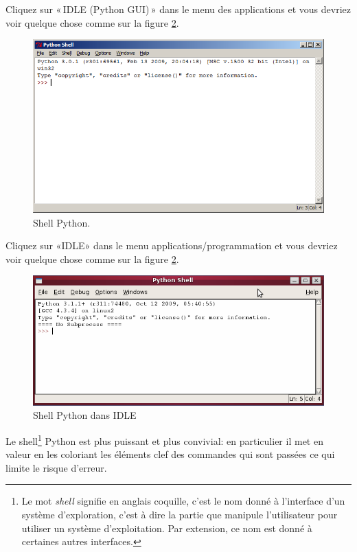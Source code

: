 \begin{WINDOWS}
Cliquez sur « IDLE (Python GUI) » dans le menu des applications et vous devriez voir quelque chose comme sur la figure \ref{fig:shell}.

\begin{figure}[!ht]
\centering
\includegraphics[scale=0.6]{images/shell}
\caption{Shell Python.}\label{fig:shell}
\end{figure}
\end{WINDOWS}

\begin{LINUX}
Cliquez sur «IDLE» dans le menu applications/programmation et vous devriez 
voir quelque chose comme sur la figure \ref{fig:shell}.

\begin{figure}[!ht]
\centering
\includegraphics[scale=0.6]{images/linux-idle-shell}
\caption{Shell Python dans IDLE}\label{fig:shell}
\end{figure}
\end{LINUX}


Le shell\footnote{Le mot \emph{shell} signifie en anglais coquille, c'est le nom donné à l'interface d'un système d'exploration, c'est à dire la partie que manipule l'utilisateur pour utiliser un système d'exploitation. Par extension, ce nom est donné à certaines autres interfaces.} Python est plus puissant et plus convivial: en particulier il met en valeur en les coloriant les éléments clef des commandes qui sont passées ce qui limite le risque d'erreur.


